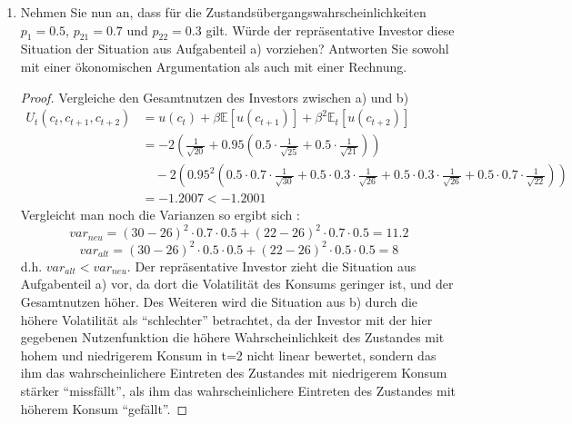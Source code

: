 \documentclass[12pt]{extreport} %
\theoremstyle{named}
\theoremstyle{nnamed}
\theoremstyle{itshape}
\theoremstyle{normal}
\begin{document}
\begin{enumerate}
\begin{proof}
\begin{align*}
						& \quad-2 \left( 0.95^2 \left( 0.25 \cdot \frac{1}{\sqrt{30}} + 0.25 \cdot \frac{1}{\sqrt{26}} + 0.25 \cdot \frac{1}{\sqrt{26}} + 0.25 \cdot \frac{1}{\sqrt{22}} \right)  \right) \\
						& = - 1.2001
			\end{align*} 
		\end{proof}
	\item Nehmen Sie nun an, dass für die Zustandsübergangswahrscheinlichkeiten $p_1 = 0.5$, $p_{21} = 0.7$ und $p_{22} = 0.3$ gilt. Würde der repräsentative Investor diese Situation der Situation aus Aufgabenteil a) vorziehen? Antworten Sie sowohl mit einer ökonomischen Argumentation als auch mit einer Rechnung.
		\begin{proof}
			Vergleiche den Gesamtnutzen des Investors zwischen a) und b)
				\begin{align*}
				U_t(c_t, c_{t+1}, c_{t+2}) & = u(c_t) + \beta \mathbb{E}[ u(c_{t+1})] + \beta^2 \mathbb{E}_t \left[ u(c_{t+2}) \right] \\
						& = -2 \left( \frac{1}{\sqrt{20}} + 0.95 \left( 0.5 \cdot \frac{1}{\sqrt{25}} + 0.5 \cdot \frac{1}{\sqrt{21}} \right)\right) \\
						& \quad-2 \left( 0.95^2 \left( 0.5 \cdot 0.7 \cdot \frac{1}{\sqrt{30}} + 0.5 \cdot 0.3 \cdot \frac{1}{\sqrt{26}} + 0.5 \cdot 0.3 \cdot \frac{1}{\sqrt{26}} + 0.5 \cdot 0.7 \cdot \frac{1}{\sqrt{22}} \right)  \right) \\
						& = - 1.2007 < -1.2001
			\end{align*} 		
			Vergleicht man noch die Varianzen so ergibt sich :
			$$ var_{neu} = (30-26)^2 \cdot 0.7 \cdot 0.5 + (22 - 26)^2 \cdot 0.7 \cdot 0.5 = 11.2 $$
			$$ var_{alt} = (30 - 26)^2 \cdot 0.5 \cdot 0.5 + (22 - 26)^2 \cdot 0.5 \cdot 0.5 = 8 $$
			d.h. $var_{alt}<var_{neu}$. Der repräsentative Investor zieht die Situation aus Aufgabenteil a) vor, da dort die Volatilität des Konsums geringer ist, und der Gesamtnutzen höher. Des Weiteren wird die Situation aus b) durch die höhere Volatilität als \enquote{schlechter} betrachtet, da der Investor mit der hier gegebenen Nutzenfunktion die höhere Wahrscheinlichkeit des Zustandes mit hohem und niedrigerem Konsum in t=2 nicht linear bewertet, sondern das ihm das wahrscheinlichere Eintreten des Zustandes mit  niedrigerem Konsum  stärker \enquote{missfällt}, als ihm das wahrscheinlichere Eintreten des Zustandes mit höherem Konsum \enquote{gefällt}. %
		\end{proof}
\end{enumerate}

\renewcommand{\indexname}{Stichwortverzeichnis}
\printindex
\end{document}
